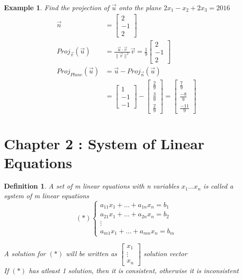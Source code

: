\documentclass{article}
\newtheorem{ex}[theorem]{Example}
\newtheorem{definition}[theorem]{Definition}
\begin{document}
\begin{ex}
Find the projection of \( \vec{u}\) onto the plane \( 2x_1 - x_2 + 2x_3 = 2016 \)\\
\[ \begin{aligned} \vec{n} & = \begin{bmatrix} 2 \\ -1 \\ 2 \end{bmatrix} \\
 Proj_{\vec{v}} (\vec{u}) & = \frac{\vec{u}\cdot\vec{v}}{\|\vec{v}\|^2} \vec{v} = \frac{1}{9} \begin{bmatrix} 2\\ -1\\ 2 \end{bmatrix}\\
 Proj_{Plane} (\vec{u}) & = \vec{u} - Proj_{\vec{n}} (\vec{u}) \\
& = \begin{bmatrix} 1 \\ -1\\ -1 \end{bmatrix} - \begin{bmatrix} \frac{2}{9} \\ \frac{3}{9}\\ \frac{2}{9} \end{bmatrix} = \begin{bmatrix} \frac{7}{9} \\ \frac{-8}{9}\\ \frac{-11}{9} \end{bmatrix} \end{aligned} \]
\end{ex}


\section{Chapter 2 : System of Linear Equations}
\begin{definition}
A set of m linear equations with n variables \(x_1 \ldots x_n \) is called a system of m linear equations \\
\[ (\ast) \begin{cases} a_{11} x_1 + \ldots + a_{1n} x_n = b_1 \\ a_{21}x_1 + \ldots + a_{2n} x_n = b_2 \\
\vdots \\ a_{m1}x_1 + \ldots + a_{mn} x_n = b_m \end{cases} \]

A solution for \( (\ast) \) will be written as \(\begin{bmatrix} x_1 \\ \vdots \\ x_n \end{bmatrix} \) solution vector \\
If \( (\ast) \) has atleast 1 solution, then it is consistent, otherwise it is inconsistent
\end{definition}
\end{document}
